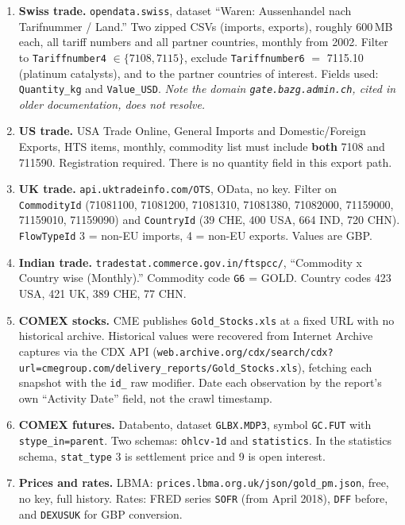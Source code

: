 \documentclass[11pt,a4paper]{article}
\begin{document}
\begin{enumerate}[leftmargin=*]
\item \textbf{Swiss trade.} \texttt{opendata.swiss}, dataset ``Waren: Aussenhandel nach
Tarifnummer / Land.'' Two zipped CSVs (imports, exports), roughly 600\,MB each, all tariff
numbers and all partner countries, monthly from 2002. Filter to
\texttt{Tariffnumber4} $\in \{7108, 7115\}$, exclude \texttt{Tariffnumber6} $=$ 7115.10
(platinum catalysts), and to the partner countries of interest. Fields used:
\texttt{Quantity\_kg} and \texttt{Value\_USD}. \emph{Note the domain
\texttt{gate.bazg.admin.ch}, cited in older documentation, does not resolve.}

\item \textbf{US trade.} USA Trade Online, General Imports and Domestic/Foreign Exports, HTS
items, monthly, commodity list must include \textbf{both} 7108 and 711590. Registration
required. There is no quantity field in this export path.

\item \textbf{UK trade.} \texttt{api.uktradeinfo.com/OTS}, OData, no key. Filter on
\texttt{CommodityId} (71081100, 71081200, 71081310, 71081380, 71082000, 71159000, 71159010,
71159090) and \texttt{CountryId} (39 CHE, 400 USA, 664 IND, 720 CHN).
\texttt{FlowTypeId} 3 = non-EU imports, 4 = non-EU exports. Values are GBP.

\item \textbf{Indian trade.} \texttt{tradestat.commerce.gov.in/ftspcc/}, ``Commodity x Country
wise (Monthly).'' Commodity code \texttt{G6} = GOLD. Country codes 423 USA, 421 UK, 389 CHE,
77 CHN.

\item \textbf{COMEX stocks.} CME publishes \texttt{Gold\_Stocks.xls} at a fixed URL with no
historical archive. Historical values were recovered from Internet Archive captures via the CDX
API (\texttt{web.archive.org/cdx/search/cdx?url=cmegroup.com/delivery\_reports/Gold\_Stocks.xls}),
fetching each snapshot with the \texttt{id\_} raw modifier. Date each observation by the
report's own ``Activity Date'' field, not the crawl timestamp.

\item \textbf{COMEX futures.} Databento, dataset \texttt{GLBX.MDP3}, symbol \texttt{GC.FUT} with
\texttt{stype\_in=parent}. Two schemas: \texttt{ohlcv-1d} and \texttt{statistics}. In the
statistics schema, \texttt{stat\_type} 3 is settlement price and 9 is open interest.

\item \textbf{Prices and rates.} LBMA: \texttt{prices.lbma.org.uk/json/gold\_pm.json}, free, no
key, full history. Rates: FRED series \texttt{SOFR} (from April 2018), \texttt{DFF} before, and
\texttt{DEXUSUK} for GBP conversion.


\end{enumerate}
\end{document}
